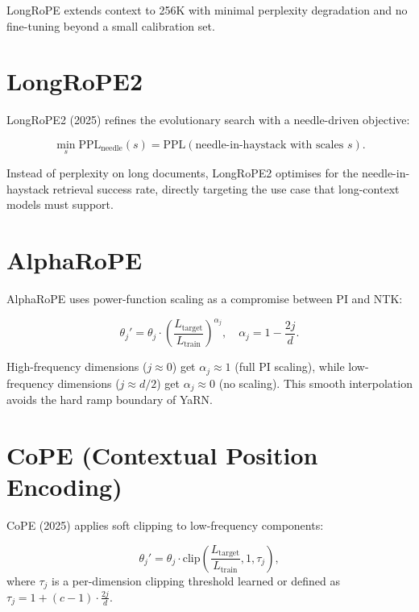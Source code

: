 \documentclass[11pt,a4paper]{book}
\theoremstyle{definition}
\begin{document}
LongRoPE extends context to 256K with minimal perplexity degradation and no fine-tuning beyond a small calibration set.

\section{LongRoPE2}

LongRoPE2 (2025) refines the evolutionary search with a needle-driven objective:

\begin{equation}
	\min_{s} \text{PPL}_{\text{needle}}(s) = \text{PPL}(\text{needle-in-haystack with scales } s).
\end{equation}

Instead of perplexity on long documents, LongRoPE2 optimises for the needle-in-haystack retrieval success rate, directly targeting the use case that long-context models must support.

\section{AlphaRoPE}

AlphaRoPE uses power-function scaling as a compromise between PI and NTK:

\begin{equation}
	\theta_j' = \theta_j \cdot \left(\frac{L_{\text{target}}}{L_{\text{train}}}\right)^{\alpha_j},
	\quad \alpha_j = 1 - \frac{2j}{d}.
\end{equation}

High-frequency dimensions ($j \approx 0$) get $\alpha_j \approx 1$ (full PI scaling), while low-frequency dimensions ($j \approx d/2$) get $\alpha_j \approx 0$ (no scaling). This smooth interpolation avoids the hard ramp boundary of YaRN.

\section{CoPE (Contextual Position Encoding)}

CoPE (2025) applies soft clipping to low-frequency components:

\begin{equation}
	\theta_j' = \theta_j \cdot \text{clip}\left(\frac{L_{\text{target}}}{L_{\text{train}}}, 1, \tau_j\right),
\end{equation}
where $\tau_j$ is a per-dimension clipping threshold learned or defined as $\tau_j = 1 + (c-1) \cdot \frac{2j}{d}$.
\end{document}
